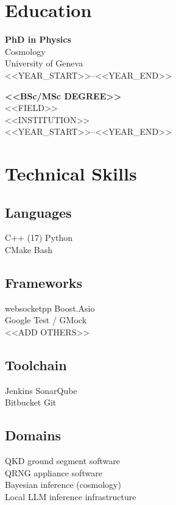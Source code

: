 \documentclass[10pt,a4paper]{article}
\newlength{\leftcolwidth}
\begin{document}
\begin{minipage}[t]{\leftcolwidth}


\section{Education}

\textbf{PhD in Physics}\\
Cosmology\\
University of Geneva\\
<<YEAR_START>>--<<YEAR_END>>

\vspace{4pt}

\textbf{<<BSc/MSc DEGREE>>}\\
<<FIELD>>\\
<<INSTITUTION>>\\
<<YEAR_START>>--<<YEAR_END>>

\section{Technical Skills}

\subsection{Languages}
C++ (17) \textbullet{} Python\\
CMake \textbullet{} Bash

\subsection{Frameworks}
websocketpp \textbullet{} Boost.Asio\\
Google Test / GMock\\
<<ADD OTHERS>>

\subsection{Toolchain}
Jenkins \textbullet{} SonarQube\\
Bitbucket \textbullet{} Git

\subsection{Domains}
QKD ground segment software\\
QRNG appliance software\\
Bayesian inference (cosmology)\\
Local LLM inference infrastructure


\end{minipage}
\end{document}
